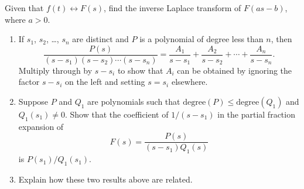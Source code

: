 \documentclass{ximera}
\begin{document}
\begin{problem}\label{exer:8.2.9}
 Given that $f(t)\leftrightarrow F(s)$, find the inverse
Laplace transform of $F(as-b)$, where $a>0$.
\end{problem}

\begin{problem}\label{exer:8.2.10}
\begin{enumerate}
\item  %
If $s_1$, $s_2$, \dots, $s_n$ are distinct and $P$ is a polynomial of
degree less than $n$, then
$$
\frac{P(s)}{(s-s_1)(s-s_2)\cdots(s-s_n)}=
\frac{A_1}{s-s_1}+\frac{A_2}{s-s_2}+\cdots+\frac{A_n}{s-s_n}.
$$
Multiply through by $s-s_i$ to show that
 $A_i$ can be obtained by ignoring the factor $s-s_i$ on the
left and setting $s=s_i$ elsewhere.
\item %
Suppose $P$ and $Q_1$ are polynomials such that
$\text{degree}(P)\le\text{degree}(Q_1)$ and $Q_1(s_1)\ne0$.
Show that the coefficient of $1/(s-s_1)$ in the partial fraction
expansion of
$$
F(s)=\frac{P(s)}{(s-s_1)Q_1(s)}
$$
is $P(s_1)/Q_1(s_1)$.
\item %
Explain how these two results above are related.
\end{enumerate}
\end{problem}
\end{document}
